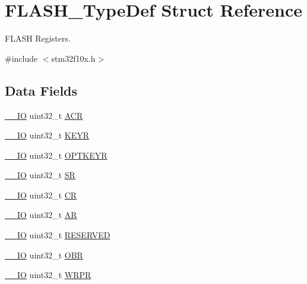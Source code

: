 \hypertarget{struct_f_l_a_s_h___type_def}{}\section{F\+L\+A\+S\+H\+\_\+\+Type\+Def Struct Reference}
\label{struct_f_l_a_s_h___type_def}


F\+L\+A\+SH Registers.  




{\ttfamily \#include $<$stm32f10x.\+h$>$}

\subsection*{Data Fields}
\begin{DoxyCompactItemize}
\item 
\mbox{\hyperlink{core__sc300_8h_aec43007d9998a0a0e01faede4133d6be}{\+\_\+\+\_\+\+IO}} uint32\+\_\+t \mbox{\hyperlink{struct_f_l_a_s_h___type_def_a9cb55206b29a8c16354747c556ab8bea}{A\+CR}}
\item 
\mbox{\hyperlink{core__sc300_8h_aec43007d9998a0a0e01faede4133d6be}{\+\_\+\+\_\+\+IO}} uint32\+\_\+t \mbox{\hyperlink{struct_f_l_a_s_h___type_def_a84c491be6c66b1d5b6a2efd0740b3d0c}{K\+E\+YR}}
\item 
\mbox{\hyperlink{core__sc300_8h_aec43007d9998a0a0e01faede4133d6be}{\+\_\+\+\_\+\+IO}} uint32\+\_\+t \mbox{\hyperlink{struct_f_l_a_s_h___type_def_afc4900646681dfe1ca43133d376c4423}{O\+P\+T\+K\+E\+YR}}
\item 
\mbox{\hyperlink{core__sc300_8h_aec43007d9998a0a0e01faede4133d6be}{\+\_\+\+\_\+\+IO}} uint32\+\_\+t \mbox{\hyperlink{struct_f_l_a_s_h___type_def_af6aca2bbd40c0fb6df7c3aebe224a360}{SR}}
\item 
\mbox{\hyperlink{core__sc300_8h_aec43007d9998a0a0e01faede4133d6be}{\+\_\+\+\_\+\+IO}} uint32\+\_\+t \mbox{\hyperlink{struct_f_l_a_s_h___type_def_ab40c89c59391aaa9d9a8ec011dd0907a}{CR}}
\item 
\mbox{\hyperlink{core__sc300_8h_aec43007d9998a0a0e01faede4133d6be}{\+\_\+\+\_\+\+IO}} uint32\+\_\+t \mbox{\hyperlink{struct_f_l_a_s_h___type_def_a2ac50357d1ebac2949d27bfc4855e6a4}{AR}}
\item 
\mbox{\hyperlink{core__sc300_8h_aec43007d9998a0a0e01faede4133d6be}{\+\_\+\+\_\+\+IO}} uint32\+\_\+t \mbox{\hyperlink{struct_f_l_a_s_h___type_def_ad21eb922f00d583e80943def27a0f05c}{R\+E\+S\+E\+R\+V\+ED}}
\item 
\mbox{\hyperlink{core__sc300_8h_aec43007d9998a0a0e01faede4133d6be}{\+\_\+\+\_\+\+IO}} uint32\+\_\+t \mbox{\hyperlink{struct_f_l_a_s_h___type_def_aadec05237ee04c5a913c7ca9cd944f38}{O\+BR}}
\item 
\mbox{\hyperlink{core__sc300_8h_aec43007d9998a0a0e01faede4133d6be}{\+\_\+\+\_\+\+IO}} uint32\+\_\+t \mbox{\hyperlink{struct_f_l_a_s_h___type_def_a9bc0e514c0860e3c153a6cfa72bdf1c3}{W\+R\+PR}}
\end{DoxyCompactItemize}


